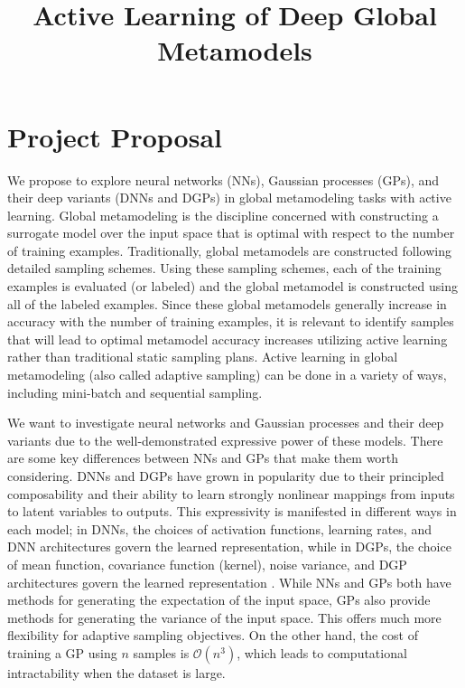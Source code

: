 \documentclass[conference]{IEEEtran}
\begin{document}
\title{\LARGE \textbf{Active Learning of Deep Global Metamodels} 
}


\author{
} %


\maketitle

\section{Project Proposal}
\label{sec:introduction}

We propose to explore neural networks (NNs), Gaussian processes (GPs), and their deep variants (DNNs and DGPs) in global metamodeling tasks with active learning. Global metamodeling is the discipline concerned with constructing a surrogate model over the input space that is optimal with respect to the number of training examples. Traditionally, global metamodels are constructed following detailed sampling schemes. Using these sampling schemes, each of the training examples is evaluated (or labeled) and the global metamodel is constructed using all of the labeled examples. Since these global metamodels generally increase in accuracy with the number of training examples, it is relevant to identify samples that will lead to optimal metamodel accuracy increases utilizing active learning rather than traditional static sampling plans. Active learning in global metamodeling (also called adaptive sampling) can be done in a variety of ways, including mini-batch and sequential sampling.

We want to investigate neural networks and Gaussian processes and their deep variants due to the well-demonstrated expressive power of these models. There are some key differences between NNs and GPs that make them worth considering. DNNs and DGPs have grown in popularity due to their principled composability and their ability to learn strongly nonlinear mappings from inputs to latent variables to outputs. This expressivity is manifested in different ways in each model; in DNNs, the choices of activation functions, learning rates, and DNN architectures govern the learned representation, while in DGPs, the choice of mean function, covariance function (kernel), noise variance, and DGP architectures govern the learned representation \cite{Damianou2013DeepProcesses}. While NNs and GPs both have methods for generating the expectation of the input space, GPs also provide methods for generating the variance of the input space. This offers much more flexibility for adaptive sampling objectives. On the other hand, the cost of training a GP using $n$ samples is $\mathcal{O}(n^3)$, which leads to computational intractability when the dataset is large.
\end{document}
